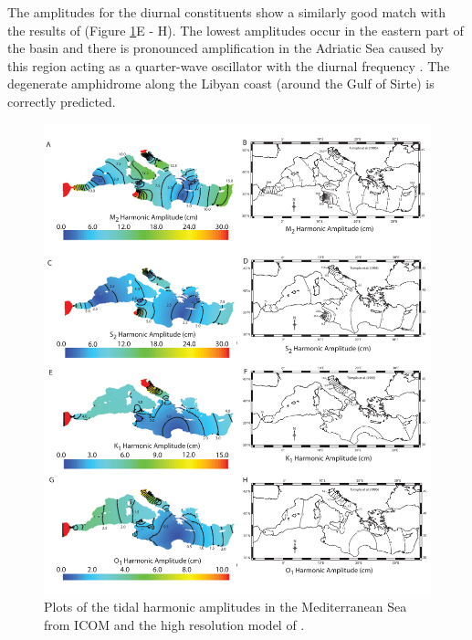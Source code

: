 The amplitudes for the diurnal constituents show a similarly good match with the results of \citet{Tsimplis1995} (Figure \ref{amp}E - H).
The lowest amplitudes occur in the eastern part of the basin and there is pronounced amplification in the Adriatic Sea caused by this region
acting as a quarter-wave oscillator with the diurnal frequency \citep{Wells2008}. The degenerate amphidrome
along the Libyan coast (around the Gulf of Sirte) is correctly predicted.   

\begin{figure}[t!]
\centering
\includegraphics[width=\textwidth]{./examples_images/tides_in_the_Mediterranean_Sea/amp.pdf}
\caption{Plots of the tidal harmonic amplitudes in the Mediterranean Sea from ICOM and the high resolution
model of \citet{Tsimplis1995}.}
\label{amp}
\end{figure}

